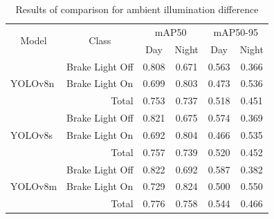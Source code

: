\begin{table}[!b]
    \caption{Results of comparison for ambient illumination difference}
    \label{tab:dayNnight}
    \begin{tabular}{llcccc}
    \toprule
    \multicolumn{1}{c}{\multirow{2}{*}{Model}} & \multicolumn{1}{c}{\multirow{2}{*}{Class}} & \multicolumn{2}{c}{mAP50}                           & \multicolumn{2}{c}{mAP50-95}                        \\
    \multicolumn{1}{c}{}                       & \multicolumn{1}{c}{}                       & \multicolumn{1}{c}{Day} & \multicolumn{1}{c}{Night} & \multicolumn{1}{c}{Day} & \multicolumn{1}{c}{Night} \\
    \midrule
    \multirow{3}{*}{YOLOv8n}                   & Brake Light Off                            & 0.808          & 0.671               & 0.563          & 0.366                     \\
    & Brake Light On                             & 0.699                   & 0.803            & 0.473                   & 0.536            \\
    & \multicolumn{1}{r}{Total}                  & 0.753          & 0.737                     & 0.518          & 0.451                     \\

    \midrule
    \multirow{3}{*}{YOLOv8s}                   & Brake Light Off                            & 0.821          & 0.675                     & 0.574          & 0.369                     \\
    & Brake Light On                             & 0.692                   & 0.804            & 0.466                   & 0.535            \\
    & \multicolumn{1}{r}{Total}                  & 0.757          & 0.739                     & 0.520          & 0.452                     \\

    \midrule
    \multirow{3}{*}{YOLOv8m}                   & Brake Light Off                            & 0.822          & 0.692                     & 0.587          & 0.382                     \\
    & Brake Light On                             & 0.729                   & 0.824            & 0.500                   & 0.550            \\
    & \multicolumn{1}{r}{Total}                  & 0.776                   & 0.758                     & 0.544          & 0.466                     \\


\end{tabular}
\end{table}
